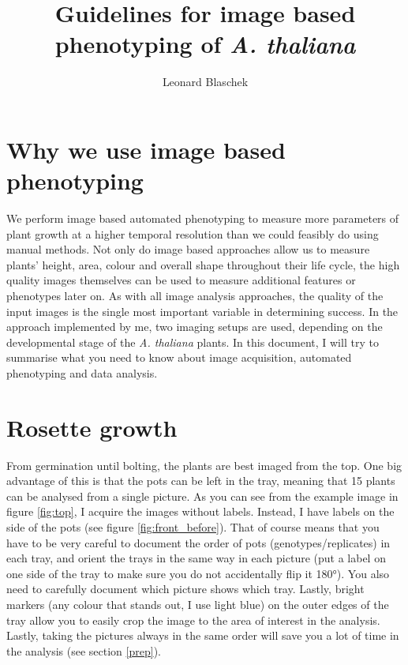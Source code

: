 \documentclass[10pt]{article}
\title{Guidelines for image based phenotyping of \textit{A. thaliana}}
\author{Leonard Blaschek}
\begin{document}
 	\maketitle
 	
 	\section*{Why we use image based phenotyping}
 	
	We perform image based automated phenotyping to measure more parameters of plant growth at a higher temporal resolution than we could feasibly do using manual methods. Not only do image based approaches allow us to measure plants' height, area, colour and overall shape throughout their life cycle, the high quality images themselves can be used to measure additional features or phenotypes later on. As with all image analysis approaches, the quality of the input images is the single most important variable in determining success. In the approach implemented by me, two imaging setups are used, depending on the developmental stage of the \textit{A. thaliana} plants. In this document, I will try to summarise what you need to know about image acquisition, automated phenotyping and data analysis.
	
	\tableofcontents
	
	\newpage

 	\section{Rosette growth}
 	
 	From germination until bolting, the plants are best imaged from the top. One big advantage of this is that the pots can be left in the tray, meaning that 15 plants can be analysed from a single picture. As you can see from the example image in figure \ref{fig:top}, I acquire the images without labels. Instead, I have labels on the side of the pots (see figure \ref{fig:front_before}). That of course means that you have to be very careful to document the order of pots (genotypes/replicates) in each tray, and orient the trays in the same way in each picture (put a label on one side of the tray to make sure you do not accidentally flip it 180°). You also need to carefully document which picture shows which tray. Lastly, bright markers (any colour that stands out, I use light blue) on the outer edges of the tray allow you to easily crop the image to the area of interest in the analysis. Lastly, taking the pictures always in the same order will save you a lot of time in the analysis (see section \ref{prep}).
 		
\end{document}

